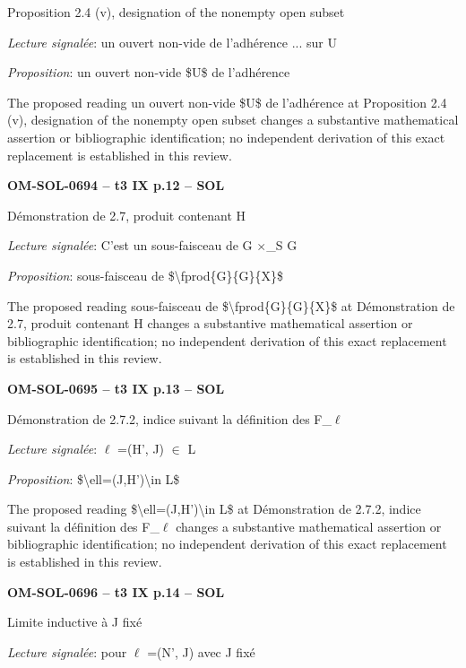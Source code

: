 Proposition 2.4 (v), designation of the nonempty open subset\par
\emph{Lecture signalée}: un ouvert non-vide de l'adhérence ... sur U\par
\emph{Proposition}: un ouvert non-vide \$U\$ de l'adhérence\par
The proposed reading un ouvert non-vide \$U\$ de l'adhérence at Proposition 2.4 (v), designation of the nonempty open subset changes a substantive mathematical assertion or bibliographic identification; no independent derivation of this exact replacement is established in this review.\par
\par\noindent\textbf{OM-SOL-0694 -- t3 IX p.12 -- SOL}\par
Démonstration de 2.7, produit contenant H\par
\emph{Lecture signalée}: C'est un sous-faisceau de G \ensuremath{\times}\_S G\par
\emph{Proposition}: sous-faisceau de \$\textbackslash{}fprod\{G\}\{G\}\{X\}\$\par
The proposed reading sous-faisceau de \$\textbackslash{}fprod\{G\}\{G\}\{X\}\$ at Démonstration de 2.7, produit contenant H changes a substantive mathematical assertion or bibliographic identification; no independent derivation of this exact replacement is established in this review.\par
\par\noindent\textbf{OM-SOL-0695 -- t3 IX p.13 -- SOL}\par
Démonstration de 2.7.2, indice suivant la définition des F\_\ensuremath{\ell}\par
\emph{Lecture signalée}: \ensuremath{\ell} =\allowbreak  (H', J) \ensuremath{\in} L\par
\emph{Proposition}: \$\textbackslash{}ell=\allowbreak (J,H')\textbackslash{}in L\$\par
The proposed reading \$\textbackslash{}ell=\allowbreak (J,H')\textbackslash{}in L\$ at Démonstration de 2.7.2, indice suivant la définition des F\_\ensuremath{\ell} changes a substantive mathematical assertion or bibliographic identification; no independent derivation of this exact replacement is established in this review.\par
\par\noindent\textbf{OM-SOL-0696 -- t3 IX p.14 -- SOL}\par
Limite inductive à J fixé\par
\emph{Lecture signalée}: pour \ensuremath{\ell} =\allowbreak  (N', J) avec J fixé\par
